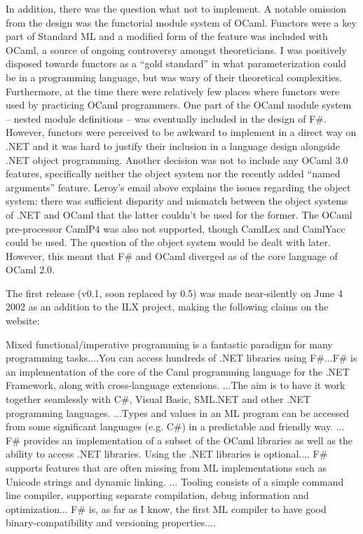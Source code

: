 \documentclass[acmsmall,review]{acmart}\settopmatter{printfolios=true,printccs=false,printacmref=false}
\begin{document}
In addition, there was the question what not to implement.  A notable omission from the design was the functorial module system of OCaml.  Functors were a key part of Standard ML and a modified form of the feature was included with OCaml, a source of ongoing controversy amongst theoreticians.  I was positively disposed towards functors as a “gold standard” in what parameterization could be in a programming language, but was wary of their theoretical complexities. Furthermore, at the time there were relatively few places where functors were used by practicing OCaml programmers. One part of the OCaml module system – nested module definitions – was eventually included in the design of F\#.  However, functors were perceived to be awkward to implement in a direct way on .NET and it was hard to justify their inclusion in a language design alongside .NET object programming. Another decision was not to include any OCaml 3.0 features, specifically neither the object system nor the recently added “named arguments” feature.  Leroy’s email above explains the issues regarding the object system: there was sufficient disparity and mismatch between the object systems of .NET and OCaml that the latter couldn’t be used for the former.  The OCaml pre-processor CamlP4 was also not supported, though CamlLex and CamlYacc could be used. The question of the object system would be dealt with later.  However, this meant that F\# and OCaml diverged as of the core language of OCaml 2.0.


The first release (v0.1, soon replaced by 0.5) was made near-silently on June 4 2002  as an addition to the ILX project, making the following claims on the website:
\begin{verbquote}
Mixed functional/imperative programming is a fantastic paradigm for many programming tasks....You can access hundreds of .NET libraries using F\#...F\# is an implementation of the core of the Caml programming language for the .NET Framework, along with cross-language extensions. ...The aim is to have it work together seamlessly with C\#, Visual Basic, SML.NET and other .NET programming languages.  ...Types and values in an ML program can be accessed from some significant languages (e.g. C\#) in a predictable and friendly way. ... F\# provides an implementation of a subset of the OCaml libraries as well as the ability to access .NET libraries.  Using the .NET libraries is optional.... F\# supports features that are often missing from ML implementations such as Unicode strings and dynamic linking.  ... Tooling consists of a simple command line compiler, supporting separate compilation, debug information and optimization... F\# is, as far as I know, the first ML compiler to have good binary-compatibility and versioning properties....
\end{verbquote}
\end{document}
